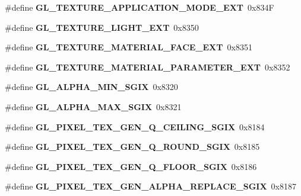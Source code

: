\begin{DoxyCompactItemize}
\item 
\#define {\bfseries G\+L\+\_\+\+T\+E\+X\+T\+U\+R\+E\+\_\+\+A\+P\+P\+L\+I\+C\+A\+T\+I\+O\+N\+\_\+\+M\+O\+D\+E\+\_\+\+E\+X\+T}~0x834\+F\label{_s_d_l__opengl_8h_aa651f1b39d2c44457de7ac6f9eff793c}

\item 
\#define {\bfseries G\+L\+\_\+\+T\+E\+X\+T\+U\+R\+E\+\_\+\+L\+I\+G\+H\+T\+\_\+\+E\+X\+T}~0x8350\label{_s_d_l__opengl_8h_a8376fe57f5e88774396255dc94218999}

\item 
\#define {\bfseries G\+L\+\_\+\+T\+E\+X\+T\+U\+R\+E\+\_\+\+M\+A\+T\+E\+R\+I\+A\+L\+\_\+\+F\+A\+C\+E\+\_\+\+E\+X\+T}~0x8351\label{_s_d_l__opengl_8h_ae4ba5757ac3cb19d684a781bf397cc79}

\item 
\#define {\bfseries G\+L\+\_\+\+T\+E\+X\+T\+U\+R\+E\+\_\+\+M\+A\+T\+E\+R\+I\+A\+L\+\_\+\+P\+A\+R\+A\+M\+E\+T\+E\+R\+\_\+\+E\+X\+T}~0x8352\label{_s_d_l__opengl_8h_a6c549217c4cd57a6720a26f7852de568}

\item 
\#define {\bfseries G\+L\+\_\+\+A\+L\+P\+H\+A\+\_\+\+M\+I\+N\+\_\+\+S\+G\+I\+X}~0x8320\label{_s_d_l__opengl_8h_a46c94ba0429896780e87011658b547f3}

\item 
\#define {\bfseries G\+L\+\_\+\+A\+L\+P\+H\+A\+\_\+\+M\+A\+X\+\_\+\+S\+G\+I\+X}~0x8321\label{_s_d_l__opengl_8h_a33b980aa2c6ad851a764a6f4c216cb67}

\item 
\#define {\bfseries G\+L\+\_\+\+P\+I\+X\+E\+L\+\_\+\+T\+E\+X\+\_\+\+G\+E\+N\+\_\+\+Q\+\_\+\+C\+E\+I\+L\+I\+N\+G\+\_\+\+S\+G\+I\+X}~0x8184\label{_s_d_l__opengl_8h_ae106db239adefee1e984b1bc077ea4e3}

\item 
\#define {\bfseries G\+L\+\_\+\+P\+I\+X\+E\+L\+\_\+\+T\+E\+X\+\_\+\+G\+E\+N\+\_\+\+Q\+\_\+\+R\+O\+U\+N\+D\+\_\+\+S\+G\+I\+X}~0x8185\label{_s_d_l__opengl_8h_abfe203223e64be34d13ecd60ba6927dc}

\item 
\#define {\bfseries G\+L\+\_\+\+P\+I\+X\+E\+L\+\_\+\+T\+E\+X\+\_\+\+G\+E\+N\+\_\+\+Q\+\_\+\+F\+L\+O\+O\+R\+\_\+\+S\+G\+I\+X}~0x8186\label{_s_d_l__opengl_8h_a51bbb19084d5e32a1f2057ed7d44d4d3}

\item 
\#define {\bfseries G\+L\+\_\+\+P\+I\+X\+E\+L\+\_\+\+T\+E\+X\+\_\+\+G\+E\+N\+\_\+\+A\+L\+P\+H\+A\+\_\+\+R\+E\+P\+L\+A\+C\+E\+\_\+\+S\+G\+I\+X}~0x8187\label{_s_d_l__opengl_8h_a0c040f87dd4520e2280bfc3b044ec8e8}


\end{DoxyCompactItemize}

